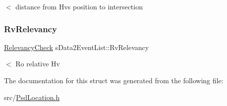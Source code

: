 $<$ distance from Hv\textquotesingle{}s position to intersection \mbox{\label{structs_data2_event_list_a98dfc70a0cf391e70011f3037065d55e}} 
\subsubsection{\texorpdfstring{Rv\+Relevancy}{RvRelevancy}}
{\footnotesize\ttfamily \hyperlink{_psd_location_8h_ad3abb902810ad80bbc508a024f5af264}{Relevancy\+Check} s\+Data2\+Event\+List\+::\+Rv\+Relevancy}

$<$ Ro relative Hv 

The documentation for this struct was generated from the following file\+:\begin{DoxyCompactItemize}
\item 
src/\hyperlink{_psd_location_8h}{Psd\+Location.\+h}\end{DoxyCompactItemize}

